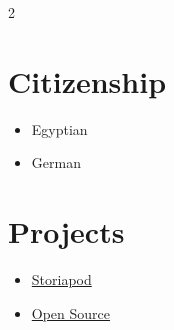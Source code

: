 \documentclass[10pt,a4paper]{article}
\newenvironment{plainlist}{%
  \begin{itemize}[leftmargin=0pt, label={}, topsep=2pt, itemsep=2pt]
}{%
  \end{itemize}
}
\begin{document}
\begin{paracol}{2}
\section{Citizenship}
\begin{plainlist}
  \item {\small\color{bodytext} Egyptian}
  \item {\small\color{bodytext} German}
\end{plainlist}

\section{Projects}
\begin{plainlist}
  \item {\small\href{https://storiapod.com}{Storiapod}}
  \item {\small\href{https://github.com/emadhegab}{Open Source \faGithub}}
\end{plainlist}

\end{paracol}
\end{document}
